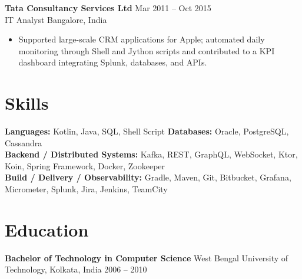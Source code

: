 \documentclass[a4paper,9pt]{article}
\begin{document}
\textbf{Tata Consultancy Services Ltd} \hfill Mar 2011 -- Oct 2015\\
IT Analyst \hfill Bangalore, India \vspace{-5pt}\\
\begin{itemize}[left=0pt, label=\textbullet, itemsep=0pt, parsep=0pt, topsep=0pt, partopsep=0pt]
    \item Supported large-scale CRM applications for Apple; automated daily monitoring through Shell and Jython scripts and contributed to a KPI dashboard integrating Splunk, databases, and APIs.
\end{itemize}

\section*{Skills}

\noindent\textbf{Languages:} Kotlin, Java, SQL, Shell Script \quad\textbf{Databases:} Oracle, PostgreSQL, Cassandra \\
\noindent\textbf{Backend / Distributed Systems:} Kafka, REST, GraphQL, WebSocket, Ktor, Koin, Spring Framework, Docker, Zookeeper \\
\noindent\textbf{Build / Delivery / Observability:} Gradle, Maven, Git, Bitbucket, Grafana, Micrometer, Splunk, Jira, Jenkins, TeamCity

\section*{Education}

\noindent\textbf{Bachelor of Technology in Computer Science} \hfill West Bengal University of Technology, Kolkata, India \hfill 2006 -- 2010
\end{document}
